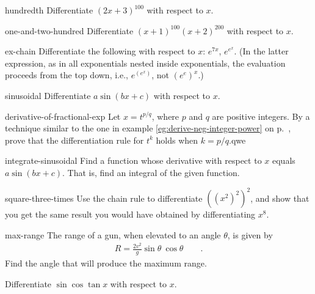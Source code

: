 \begin{hwsection}
\begin{hwwithsoln}{hundredth}
Differentiate  $(2x+3)^{100}$ with respect to $x$.
\end{hwwithsoln}

\begin{hwwithsoln}{one-and-two-hundred}
Differentiate  $(x+1)^{100}(x+2)^{200}$ with respect to $x$.
\end{hwwithsoln}

\begin{hwwithsoln}{ex-chain}
Differentiate  the following with respect to $x$: $e^{7x}$, $e^{e^x}$. (In the latter expression,
as in all exponentials nested inside exponentials, the evaluation proceeds from the top down, i.e.,
$e^{(e^x)}$, not $(e^e)^x$.)
\end{hwwithsoln}

\begin{hwwithsoln}{sinusoidal}
Differentiate $a\sin(bx+c)$ with respect to $x$.
\end{hwwithsoln}

\begin{hwwithsoln}{derivative-of-fractional-exp}
Let $x=t^{p/q}$, where $p$ and $q$ are positive integers. By a technique similar to the one
in example \ref{eg:derive-neg-integer-power} on p.~\pageref{eg:derive-neg-integer-power},
prove that the differentiation rule for $t^k$ holds when $k=p/q$.qwe
\end{hwwithsoln}

\begin{hwwithsoln}{integrate-sinusoidal}
Find a function whose derivative with respect to $x$ equals $a\sin(bx+c)$. That is, find an
integral of the given function.
\end{hwwithsoln}

\begin{hwwithsoln}{square-three-times}
Use the chain rule to differentiate $((x^2)^2)^2$, and show that you get the
same result you would have obtained by differentiating $x^8$.
\end{hwwithsoln}

\begin{hwwithsoln}{max-range}
The range of a gun, when elevated to an angle $\theta$, is given by
\begin{align*}
  R=\frac{2v^2}{g}\sin\theta\:\cos\theta \qquad .
\end{align*}
Find the angle that will produce the maximum range.
\end{hwwithsoln}

\begin{hw}
Differentiate $\sin \cos \tan x$ with respect to $x$.
\end{hw}


\end{hwsection}
